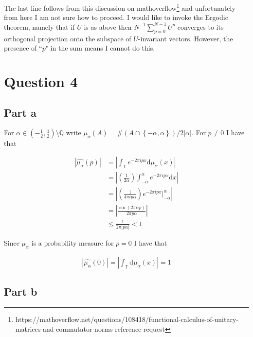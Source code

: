\documentclass{article}
\begin{document}
The last line follows from this discussion on mathoverflow\footnote{https://mathoverflow.net/questions/108418/functional-calculus-of-unitary-matrices-and-commutator-norms-reference-request} and unfortunately from here I am not sure how to proceed. I would like to invoke the Ergodic theorem, namely that if $U$ is as above then $N^{-1} \sum_{p=0}^{N-1} U^p $ converges to its orthogonal projection onto the subspace of $U$-invariant vectors. However, the presence of ``$p$" in the sum means I cannot do this. 

\section*{Question 4}

\subsection*{Part a}

For $\alpha \in \left ( -\frac{1}{2}, \frac{1}{2} \right ) \setminus \mathbb{Q} $ write $\mu_\alpha \left ( A \right ) = \# \left ( A \cap \left \{ -\alpha, \alpha \right \} \right ) / 2 | \alpha |$. For $p \neq 0$ I have that

\begin{align}
	\left | \widehat{\mu_\alpha} \left ( p \right ) \right | & = \left | \int_\mathbb{T} e^{-2 \pi i p x} \mathrm{d} \mu_\alpha \left ( x \right ) \right | \\ 
	& = \left | \left ( \frac{1}{2 \alpha} \right ) \int_{-\alpha}^\alpha e^{-2 \pi i p x} \mathrm{d} x \right | \\ 
	& = \left |\left ( \frac{1}{4 \pi i p \alpha} \right ) e^{-2 \pi i p x} \Bigr|_{-\alpha}^\alpha \right | \\ 
	& = \left | \frac{\sin \left ( 2 \pi \alpha p \right )}{2 \pi p \alpha} \right | \\ 
	& \leq \frac{1}{2 \pi \left | p \alpha \right |} < 1 
\end{align}

Since $\mu_\alpha$ is a probability measure for $p = 0$ I have that

\begin{align}
	\left | \widehat{\mu_\alpha} \left ( 0 \right ) \right | = \left | \int_\mathbb{T} \mathrm{d} \mu_\alpha \left ( x \right ) \right | = 1 
\end{align}

\subsection*{Part b}
\end{document}
